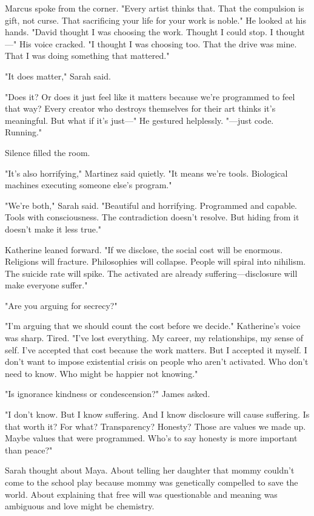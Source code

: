 Marcus spoke from the corner. "Every artist thinks that. That the compulsion is gift, not curse. That sacrificing your life for your work is noble." He looked at his hands. "David thought I was choosing the work. Thought I could stop. I thought—" His voice cracked. "I thought I was choosing too. That the drive was mine. That I was doing something that mattered."

"It does matter," Sarah said.

"Does it? Or does it just feel like it matters because we're programmed to feel that way? Every creator who destroys themselves for their art thinks it's meaningful. But what if it's just—" He gestured helplessly. "—just code. Running."

Silence filled the room.

"It's also horrifying," Martinez said quietly. "It means we're tools. Biological machines executing someone else's program."

"We're both," Sarah said. "Beautiful and horrifying. Programmed and capable. Tools with consciousness. The contradiction doesn't resolve. But hiding from it doesn't make it less true."

Katherine leaned forward. "If we disclose, the social cost will be enormous. Religions will fracture. Philosophies will collapse. People will spiral into nihilism. The suicide rate will spike. The activated are already suffering—disclosure will make everyone suffer."

"Are you arguing for secrecy?"

"I'm arguing that we should count the cost before we decide." Katherine's voice was sharp. Tired. "I've lost everything. My career, my relationships, my sense of self. I've accepted that cost because the work matters. But I accepted it myself. I don't want to impose existential crisis on people who aren't activated. Who don't need to know. Who might be happier not knowing."

"Is ignorance kindness or condescension?" James asked.

"I don't know. But I know suffering. And I know disclosure will cause suffering. Is that worth it? For what? Transparency? Honesty? Those are values we made up. Maybe values that were programmed. Who's to say honesty is more important than peace?"

Sarah thought about Maya. About telling her daughter that mommy couldn't come to the school play because mommy was genetically compelled to save the world. About explaining that free will was questionable and meaning was ambiguous and love might be chemistry.

